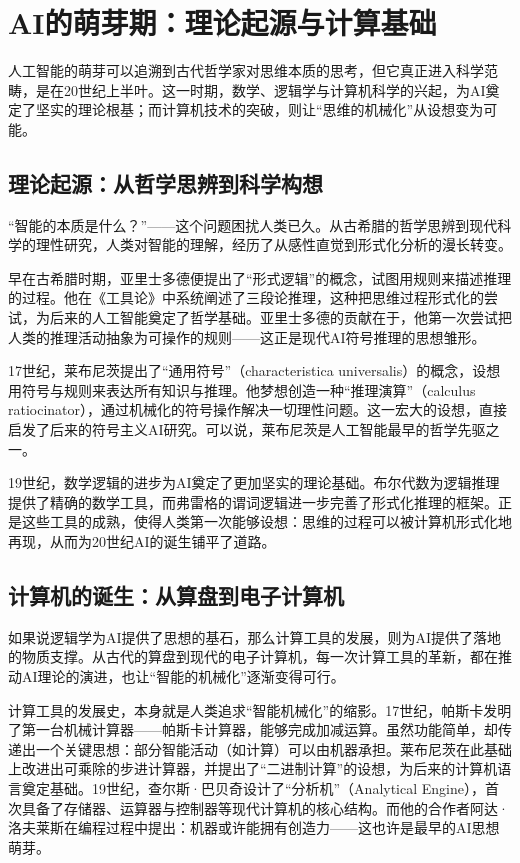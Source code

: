\section{AI的萌芽期：理论起源与计算基础}

人工智能的萌芽可以追溯到古代哲学家对思维本质的思考，但它真正进入科学范畴，是在20世纪上半叶。这一时期，数学、逻辑学与计算机科学的兴起，为AI奠定了坚实的理论根基；而计算机技术的突破，则让“思维的机械化”从设想变为可能。

\subsection{理论起源：从哲学思辨到科学构想}

“智能的本质是什么？”——这个问题困扰人类已久。从古希腊的哲学思辨到现代科学的理性研究，人类对智能的理解，经历了从感性直觉到形式化分析的漫长转变。

早在古希腊时期，亚里士多德便提出了“形式逻辑”的概念，试图用规则来描述推理的过程。他在《工具论》中系统阐述了三段论推理，这种把思维过程形式化的尝试，为后来的人工智能奠定了哲学基础。亚里士多德的贡献在于，他第一次尝试把人类的推理活动抽象为可操作的规则——这正是现代AI符号推理的思想雏形。

17世纪，莱布尼茨提出了“通用符号”（characteristica universalis）的概念，设想用符号与规则来表达所有知识与推理。他梦想创造一种“推理演算”（calculus ratiocinator），通过机械化的符号操作解决一切理性问题。这一宏大的设想，直接启发了后来的符号主义AI研究。可以说，莱布尼茨是人工智能最早的哲学先驱之一。

19世纪，数学逻辑的进步为AI奠定了更加坚实的理论基础。布尔代数为逻辑推理提供了精确的数学工具，而弗雷格的谓词逻辑进一步完善了形式化推理的框架。正是这些工具的成熟，使得人类第一次能够设想：思维的过程可以被计算机形式化地再现，从而为20世纪AI的诞生铺平了道路。

\subsection{计算机的诞生：从算盘到电子计算机}

如果说逻辑学为AI提供了思想的基石，那么计算工具的发展，则为AI提供了落地的物质支撑。从古代的算盘到现代的电子计算机，每一次计算工具的革新，都在推动AI理论的演进，也让“智能的机械化”逐渐变得可行。

计算工具的发展史，本身就是人类追求“智能机械化”的缩影。17世纪，帕斯卡发明了第一台机械计算器——帕斯卡计算器，能够完成加减运算。虽然功能简单，却传递出一个关键思想：部分智能活动（如计算）可以由机器承担。莱布尼茨在此基础上改进出可乘除的步进计算器，并提出了“二进制计算”的设想，为后来的计算机语言奠定基础。19世纪，查尔斯·巴贝奇设计了“分析机”（Analytical Engine），首次具备了存储器、运算器与控制器等现代计算机的核心结构。而他的合作者阿达·洛夫莱斯在编程过程中提出：机器或许能拥有创造力——这也许是最早的AI思想萌芽。

